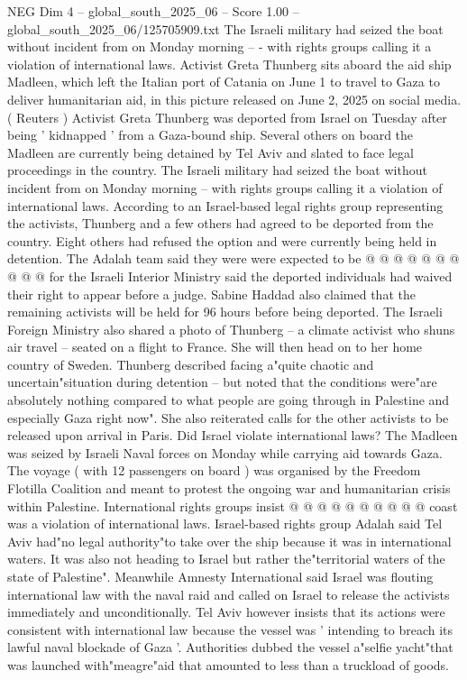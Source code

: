 \begin{textsample}{NEG Dim 4 – global\_south\_2025\_06 – Score 1.00 – global\_south\_2025\_06/125705909.txt}  \label{ex:f4_neg_109}
The Israeli military had seized the boat without incident from on Monday morning -- - with rights groups calling it a violation of international laws.
Activist Greta Thunberg sits aboard the aid ship Madleen, which left the Italian port of Catania on June 1 to travel to Gaza to deliver humanitarian aid, in this picture released on June 2, 2025 on social media. ( Reuters ) Activist Greta Thunberg was deported from Israel on Tuesday after being ' kidnapped ' from a Gaza-bound ship.
Several others on board the Madleen are currently being detained by Tel Aviv and slated to face legal proceedings in the country.
The Israeli military had seized the boat without incident from on Monday morning -- with rights groups calling it a violation of international laws.
According to an Israel-based legal rights group representing the activists, Thunberg and a few others had agreed to be deported from the country.
Eight others had refused the option and were currently being held in detention.
The Adalah team said they were were expected to be @ @ @ @ @ @ @ @ @ @ for the Israeli Interior Ministry said the deported individuals had waived their right to appear before a judge.
Sabine Haddad also claimed that the remaining activists will be held for 96 hours before being deported.
The Israeli Foreign Ministry also shared a photo of Thunberg -- a climate activist who shuns air travel -- seated on a flight to France.
She will then head on to her home country of Sweden.
Thunberg described facing a"quite chaotic and uncertain"situation during detention -- but noted that the conditions were"are absolutely nothing compared to what people are going through in Palestine and especially Gaza right now".
She also reiterated calls for the other activists to be released upon arrival in Paris.
Did Israel violate international laws?
The Madleen was seized by Israeli Naval forces on Monday while carrying aid towards Gaza.
The voyage ( with 12 passengers on board ) was organised by the Freedom Flotilla Coalition and meant to protest the ongoing war and humanitarian crisis within Palestine.
International rights groups insist @ @ @ @ @ @ @ @ @ @ coast was a violation of international laws.
Israel-based rights group Adalah said Tel Aviv had"no legal authority"to take over the ship because it was in international waters.
It was also not heading to Israel but rather the"territorial waters of the state of Palestine".
Meanwhile Amnesty International said Israel was flouting international law with the naval raid and called on Israel to release the activists immediately and unconditionally.
Tel Aviv however insists that its actions were consistent with international law because the vessel was ' intending to breach its lawful naval blockade of Gaza '.
Authorities dubbed the vessel a"selfie yacht"that was launched with"meagre"aid that amounted to less than a truckload of goods.

\end{textsample}
